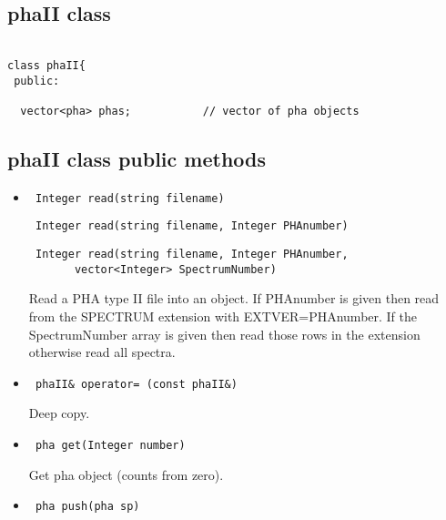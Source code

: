 \documentclass[11pt]{book}
\begin{document}
  
\subsection{phaII class}

\begin{verbatim}

class phaII{
 public:

  vector<pha> phas;           // vector of pha objects

\end{verbatim}

\subsection{phaII class public methods}

\begin{itemize}

\item  \begin{verbatim} Integer read(string filename) \end{verbatim}
       \begin{verbatim} Integer read(string filename, Integer PHAnumber) \end{verbatim}
       \begin{verbatim} Integer read(string filename, Integer PHAnumber, 
       vector<Integer> SpectrumNumber) \end{verbatim}

           Read a PHA type II file into an object. If PHAnumber is
           given then read from the SPECTRUM extension with EXTVER=PHAnumber.
           If the SpectrumNumber array is given then read those rows
           in the extension otherwise read all spectra.

\item  \begin{verbatim} phaII& operator= (const phaII&) \end{verbatim}

           Deep copy.

\item  \begin{verbatim} pha get(Integer number) \end{verbatim}
  
           Get pha object (counts from zero).

\item  \begin{verbatim} pha push(pha sp) \end{verbatim}


\end{itemize}
\end{document}
